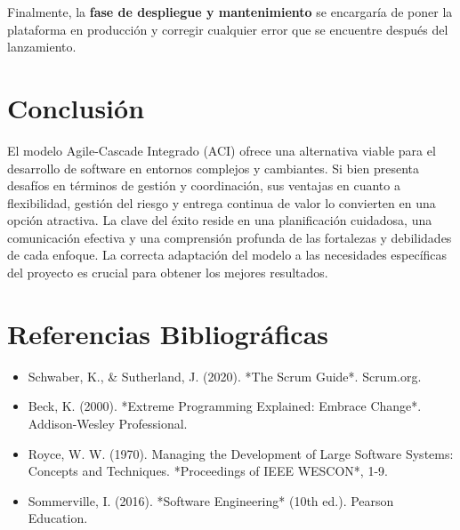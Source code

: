 \documentclass[12pt, spanish]{article}
\begin{document}
Finalmente, la \textbf{fase de despliegue y mantenimiento} se encargaría de poner la plataforma en producción y corregir cualquier error que se encuentre después del lanzamiento.

\section*{Conclusión}

El modelo Agile-Cascade Integrado (ACI) ofrece una alternativa viable para el desarrollo de software en entornos complejos y cambiantes. Si bien presenta desafíos en términos de gestión y coordinación, sus ventajas en cuanto a flexibilidad, gestión del riesgo y entrega continua de valor lo convierten en una opción atractiva. La clave del éxito reside en una planificación cuidadosa, una comunicación efectiva y una comprensión profunda de las fortalezas y debilidades de cada enfoque. La correcta adaptación del modelo a las necesidades específicas del proyecto es crucial para obtener los mejores resultados.

\section*{Referencias Bibliográficas}

\begin{itemize}
    \item  Schwaber, K., & Sutherland, J. (2020). *The Scrum Guide*. Scrum.org.
    \item  Beck, K. (2000). *Extreme Programming Explained: Embrace Change*. Addison-Wesley Professional.
    \item  Royce, W. W. (1970). Managing the Development of Large Software Systems: Concepts and Techniques. *Proceedings of IEEE WESCON*, 1-9.
    \item  Sommerville, I. (2016). *Software Engineering* (10th ed.). Pearson Education.
\end{itemize}
\end{document}
